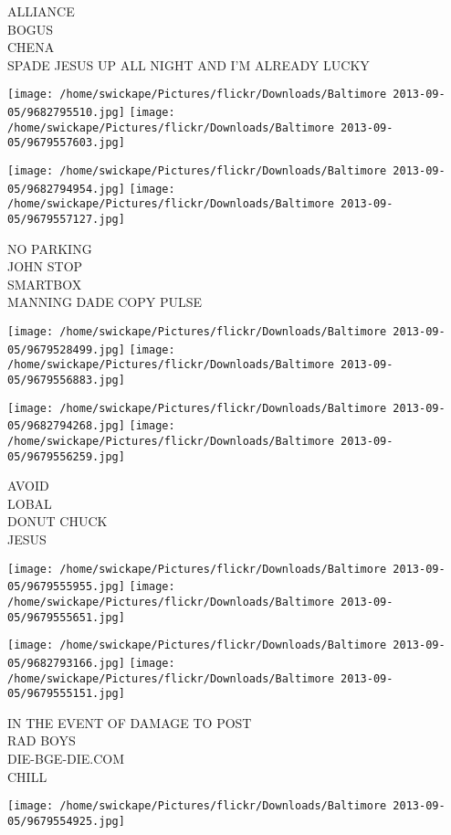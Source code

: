 \documentclass[10pt,letterpaper]{article}
\begin{document}
ALLIANCE\\
BOGUS\\
CHENA\\
SPADE JESUS UP ALL NIGHT AND I'M ALREADY LUCKY
\pagebreak

\texttt{[image: /home/swickape/Pictures/flickr/Downloads/Baltimore 2013-09-05/9682795510.jpg]}
\texttt{[image: /home/swickape/Pictures/flickr/Downloads/Baltimore 2013-09-05/9679557603.jpg]}

\texttt{[image: /home/swickape/Pictures/flickr/Downloads/Baltimore 2013-09-05/9682794954.jpg]}
\texttt{[image: /home/swickape/Pictures/flickr/Downloads/Baltimore 2013-09-05/9679557127.jpg]}

NO PARKING\\
JOHN STOP\\
SMARTBOX\\
MANNING DADE COPY PULSE
\pagebreak

\texttt{[image: /home/swickape/Pictures/flickr/Downloads/Baltimore 2013-09-05/9679528499.jpg]}
\texttt{[image: /home/swickape/Pictures/flickr/Downloads/Baltimore 2013-09-05/9679556883.jpg]}

\texttt{[image: /home/swickape/Pictures/flickr/Downloads/Baltimore 2013-09-05/9682794268.jpg]}
\texttt{[image: /home/swickape/Pictures/flickr/Downloads/Baltimore 2013-09-05/9679556259.jpg]}

AVOID\\
LOBAL\\
DONUT CHUCK\\
JESUS
\pagebreak

\texttt{[image: /home/swickape/Pictures/flickr/Downloads/Baltimore 2013-09-05/9679555955.jpg]}
\texttt{[image: /home/swickape/Pictures/flickr/Downloads/Baltimore 2013-09-05/9679555651.jpg]}

\texttt{[image: /home/swickape/Pictures/flickr/Downloads/Baltimore 2013-09-05/9682793166.jpg]}
\texttt{[image: /home/swickape/Pictures/flickr/Downloads/Baltimore 2013-09-05/9679555151.jpg]}

IN THE EVENT OF DAMAGE TO POST\\
RAD BOYS\\
DIE{-}BGE{-}DIE.COM\\
CHILL
\pagebreak

\texttt{[image: /home/swickape/Pictures/flickr/Downloads/Baltimore 2013-09-05/9679554925.jpg]}
\end{document}
